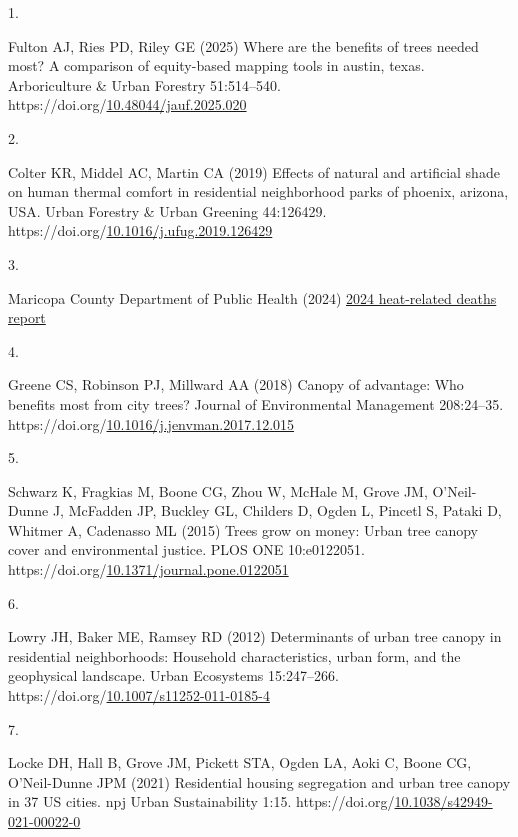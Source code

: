 \documentclass[
  sn-basic,
]{sn-jnl}
\newlength{\cslhangindent}
\newlength{\csllabelwidth}
\newenvironment{CSLReferences}[2] %
 {\begin{list}{}{%
  \setlength{\itemindent}{0pt}
  \setlength{\leftmargin}{0pt}
  \setlength{\parsep}{0pt}
  \ifodd #1
   \setlength{\leftmargin}{\cslhangindent}
   \setlength{\itemindent}{-1\cslhangindent}
  \fi
  \setlength{\itemsep}{#2\baselineskip}}}
 {\end{list}}
\newcommand{\CSLLeftMargin}[1]{\parbox[t]{\csllabelwidth}{\strut#1\strut}}
\newcommand{\CSLRightInline}[1]{\parbox[t]{\linewidth - \csllabelwidth}{\strut#1\strut}}
\begin{document}
\protect{}\label{refs}
\begin{CSLReferences}{0}{1}
\CSLLeftMargin{1. }%
\CSLRightInline{Fulton AJ, Ries PD, Riley GE (2025) Where are the
benefits of trees needed most? A comparison of equity-based mapping
tools in austin, texas. Arboriculture \& Urban Forestry 51:514--540.
https://doi.org/\href{https://doi.org/10.48044/jauf.2025.020}{10.48044/jauf.2025.020}}

\CSLLeftMargin{2. }%
\CSLRightInline{Colter KR, Middel AC, Martin CA (2019) Effects of
natural and artificial shade on human thermal comfort in residential
neighborhood parks of phoenix, arizona, USA. Urban Forestry \& Urban
Greening 44:126429.
https://doi.org/\href{https://doi.org/10.1016/j.ufug.2019.126429}{10.1016/j.ufug.2019.126429}}

\CSLLeftMargin{3. }%
\CSLRightInline{Maricopa County Department of Public Health (2024)
\href{https://www.maricopa.gov/ArchiveCenter/ViewFile/Item/5934}{2024
heat-related deaths report}}

\CSLLeftMargin{4. }%
\CSLRightInline{Greene CS, Robinson PJ, Millward AA (2018) Canopy of
advantage: Who benefits most from city trees? Journal of Environmental
Management 208:24--35.
https://doi.org/\href{https://doi.org/10.1016/j.jenvman.2017.12.015}{10.1016/j.jenvman.2017.12.015}}

\CSLLeftMargin{5. }%
\CSLRightInline{Schwarz K, Fragkias M, Boone CG, Zhou W, McHale M, Grove
JM, O'Neil-Dunne J, McFadden JP, Buckley GL, Childers D, Ogden L,
Pincetl S, Pataki D, Whitmer A, Cadenasso ML (2015) Trees grow on money:
Urban tree canopy cover and environmental justice. PLOS ONE 10:e0122051.
https://doi.org/\href{https://doi.org/10.1371/journal.pone.0122051}{10.1371/journal.pone.0122051}}

\CSLLeftMargin{6. }%
\CSLRightInline{Lowry JH, Baker ME, Ramsey RD (2012) Determinants of
urban tree canopy in residential neighborhoods: Household
characteristics, urban form, and the geophysical landscape. Urban
Ecosystems 15:247--266.
https://doi.org/\href{https://doi.org/10.1007/s11252-011-0185-4}{10.1007/s11252-011-0185-4}}

\CSLLeftMargin{7. }%
\CSLRightInline{Locke DH, Hall B, Grove JM, Pickett STA, Ogden LA, Aoki
C, Boone CG, O'Neil-Dunne JPM (2021) Residential housing segregation and
urban tree canopy in 37 US cities. npj Urban Sustainability 1:15.
https://doi.org/\href{https://doi.org/10.1038/s42949-021-00022-0}{10.1038/s42949-021-00022-0}}


\end{CSLReferences}
\end{document}
